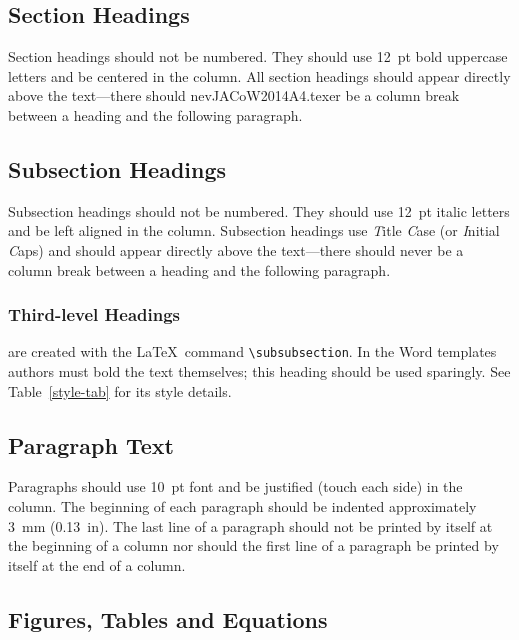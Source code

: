 \documentclass[a4paper,
              ]{jacow}
\begin{document}
\subsection{Section Headings}

Section headings should not be numbered. They should
use  \SI{12}{pt}  bold  uppercase  letters  and  be  centered  in  the
column. All section headings should appear directly above
the text---there should nevJACoW2014A4.texer be a column break between a heading and the
following paragraph.

\subsection{Subsection Headings}

Subsection  headings  should  not  be  numbered.
They should use \SI{12}{pt} italic letters and be left aligned in the column.
Subsection headings use \emph{T}itle \emph{C}ase (or \emph{I}nitial \emph{C}aps)
and should appear directly above the text---there should never be a column break
between a heading and the following paragraph.

\subsubsection{Third-level Headings} are created with the \LaTeX\ command \verb|\subsubsection|.
In the Word templates authors must bold the text themselves; this
heading should be used sparingly. See Table~\ref{style-tab} for its
style details.

\subsection{Paragraph Text}

Paragraphs should use \SI{10}{pt} font and be justified (touch each side) in
the column. The beginning of each paragraph should be indented
approximately \SI{3}{mm} (\SI{0.13}{in}). The last line of a paragraph should not be
printed by itself at the beginning of a column nor should the first line of
a paragraph be printed by itself at the end of a column.

\subsection{Figures, Tables and Equations}
\end{document}
